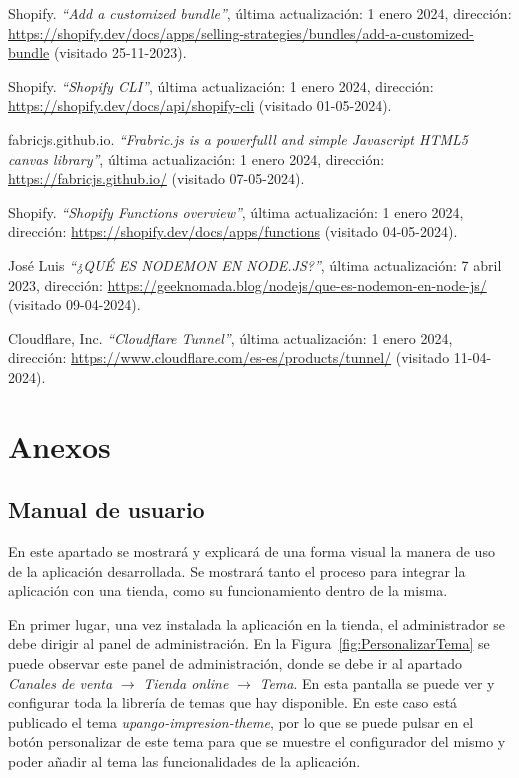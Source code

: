 \documentclass[12pt]{article}
\begin{document}
\begin{thebibliography}{100}
    Shopify.
    \textit{``Add a customized bundle''}, última actualización: 1 enero 2024, dirección: \url{https://shopify.dev/docs/apps/selling-strategies/bundles/add-a-customized-bundle} (visitado 25-11-2023).

    Shopify.
    \textit{``Shopify CLI''}, última actualización: 1 enero 2024, dirección: \url{https://shopify.dev/docs/api/shopify-cli} (visitado 01-05-2024).

    fabricjs.github.io.
    \textit{``Frabric.js is a powerfulll and simple Javascript HTML5 canvas library''}, última actualización: 1 enero 2024, dirección: \url{https://fabricjs.github.io/} (visitado 07-05-2024).

    Shopify.
    \textit{``Shopify Functions overview''}, última actualización: 1 enero 2024, dirección: \url{https://shopify.dev/docs/apps/functions} (visitado 04-05-2024).

    José Luis
    \textit{``¿QUÉ ES NODEMON EN NODE.JS?''}, última actualización: 7 abril 2023, dirección: \url{https://geeknomada.blog/nodejs/que-es-nodemon-en-node-js/} (visitado 09-04-2024).

    Cloudflare, Inc.
    \textit{``Cloudflare Tunnel''}, última actualización: 1 enero 2024, dirección: \url{https://www.cloudflare.com/es-es/products/tunnel/} (visitado 11-04-2024).

\end{thebibliography}

\clearpage
\section{Anexos}

\subsection{Manual de usuario}\label{sec:manual}
En este apartado se mostrará y explicará de una forma visual la manera de uso de la aplicación desarrollada. Se mostrará tanto el proceso para integrar la aplicación con una tienda, como
su funcionamiento dentro de la misma.

En primer lugar, una vez instalada la aplicación en la tienda, el administrador se debe dirigir al panel de administración. En la Figura~\ref{fig:PersonalizarTema} se puede observar este panel de administración, donde
se debe ir al apartado \textit{Canales de venta} $\rightarrow$  \textit{Tienda online} $\rightarrow$  \textit{Tema}. En esta pantalla se puede ver y configurar toda la librería de temas que hay disponible.
En este caso está publicado el tema \textit{upango-impresion-theme}, por lo que se puede pulsar en el botón personalizar de este tema para que se muestre el configurador del mismo y poder
añadir al tema las funcionalidades de la aplicación.
\end{document}
